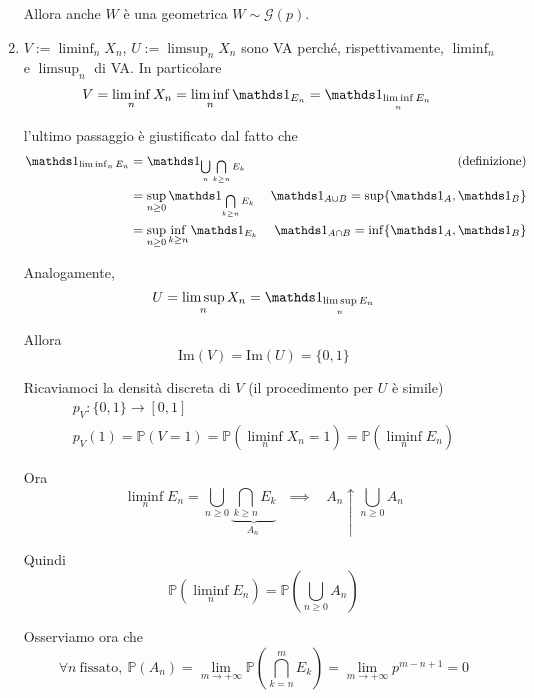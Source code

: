 \begin{enumerate}
Allora anche $W$ è una geometrica $W\sim \mathcal{G}( p)$.
\item $V:=\liminf _{n} X_{n}$, $U:=\limsup _{n} X_{n}$ sono VA perché, rispettivamente, $\liminf _{n}$ e $\limsup _{n}$ di VA. In particolare\begin{align*}
V & =\liminf _{n} X_{n} =\liminf _{n}\Ind_{E_{n}} =\Ind_{\liminf\limits _{n} E_{n}}
\end{align*}

l'ultimo passaggio è giustificato dal fatto che\begin{equation*}
\begin{aligned}
\Ind_{\liminf _{n} E_{n}} & =\Ind_{\bigcup\limits _{n}\bigcap\limits _{k\geq n} E_{k}} & \text{(definizione)}\\
 & =\sup\limits _{n\geq 0}\Ind_{\bigcap\limits _{k\geq n} E_{k}} & \Ind_{A\cup B} =\sup \{\Ind_{A} ,\Ind_{B}\}\\
 & =\sup _{n\geq 0}\inf_{k\geq n}\Ind_{E_{k}} & \Ind_{A\cap B} =\inf\{\Ind_{A} ,\Ind_{B}\}
\end{aligned}
\end{equation*}

Analogamente,\begin{equation*}
U=\limsup _{n} X_{n} =\Ind_{\limsup\limits _{n} E_{n}}
\end{equation*}

Allora\begin{equation*}
\mathrm{Im}( V) =\mathrm{Im}( U) =\{0,1\}
\end{equation*}

Ricaviamoci la densità discreta di $V$ (il procedimento per $U$ è simile)\begin{gather*}
p_{V} :\{0,1\}\rightarrow [ 0,1]\\
p_{V}( 1) =\mathbb{P}( V=1) =\mathbb{P}\left(\liminf _{n} X_{n} =1\right) =\mathbb{P}\left(\liminf _{n} E_{n}\right)
\end{gather*}

Ora\begin{equation*}
\liminf _{n} E_{n} =\bigcup _{n\geq 0}\underbrace{\bigcap\limits _{k\geq n} E_{k}}_{A_{n} \ } \ \ \ \implies \ \ \ \ A_{n} \uparrow \bigcup _{n\geq 0} A_{n}
\end{equation*}

Quindi\begin{equation*}
\mathbb{P}\left(\liminf _{n} E_{n}\right) =\mathbb{P}\left(\bigcup _{n\geq 0} A_{n}\right)
\end{equation*}

Osserviamo ora che\begin{equation*}
\forall n\ \text{fissato} ,\ \mathbb{P}\left( A_{n}\right) =\lim _{m\rightarrow +\infty }\mathbb{P}\left(\bigcap\limits _{k=n}^{m} E_{k}\right) =\lim _{m\rightarrow +\infty } p^{m-n+1} =0
\end{equation*}


\end{enumerate}
